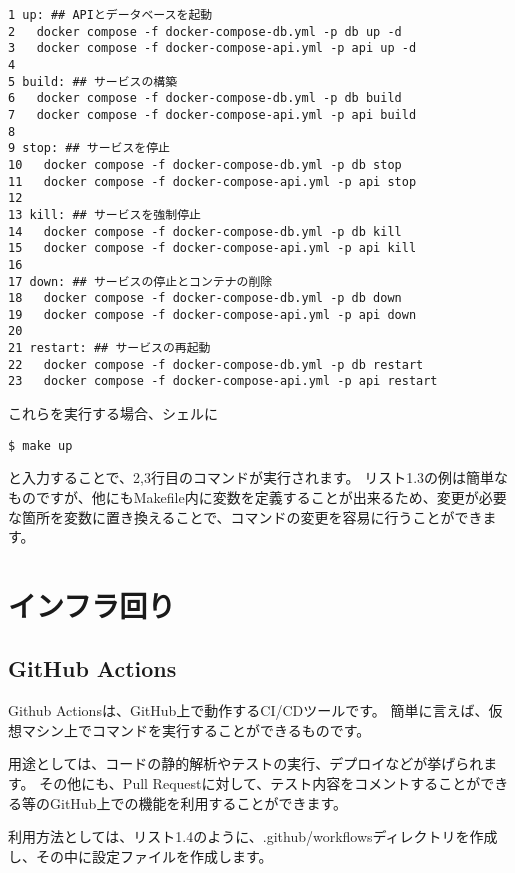 \begin{tcolorbox}[title=リスト1.3 Makefile]
  \begin{verbatim}
1 up: ## APIとデータベースを起動
2   docker compose -f docker-compose-db.yml -p db up -d
3   docker compose -f docker-compose-api.yml -p api up -d
4 
5 build: ## サービスの構築
6   docker compose -f docker-compose-db.yml -p db build
7   docker compose -f docker-compose-api.yml -p api build
8 
9 stop: ## サービスを停止
10   docker compose -f docker-compose-db.yml -p db stop
11   docker compose -f docker-compose-api.yml -p api stop
12 
13 kill: ## サービスを強制停止
14   docker compose -f docker-compose-db.yml -p db kill
15   docker compose -f docker-compose-api.yml -p api kill
16 
17 down: ## サービスの停止とコンテナの削除
18   docker compose -f docker-compose-db.yml -p db down
19   docker compose -f docker-compose-api.yml -p api down
20 
21 restart: ## サービスの再起動
22   docker compose -f docker-compose-db.yml -p db restart
23   docker compose -f docker-compose-api.yml -p api restart
 \end{verbatim}
\end{tcolorbox}

これらを実行する場合、シェルに
\begin{shaded}
  \begin{verbatim}
$ make up
\end{verbatim}
\end{shaded}
と入力することで、2,3行目のコマンドが実行されます。
リスト1.3の例は簡単なものですが、他にもMakefile内に変数を定義することが出来るため、変更が必要な箇所を変数に置き換えることで、コマンドの変更を容易に行うことができます。

\section{インフラ回り}

\subsection{GitHub Actions}
Github Actionsは、GitHub上で動作するCI/CDツールです。
簡単に言えば、仮想マシン上でコマンドを実行することができるものです。

用途としては、コードの静的解析やテストの実行、デプロイなどが挙げられます。
その他にも、Pull Requestに対して、テスト内容をコメントすることができる等のGitHub上での機能を利用することができます。

利用方法としては、リスト1.4のように、.github/workflowsディレクトリを作成し、その中に設定ファイルを作成します。

